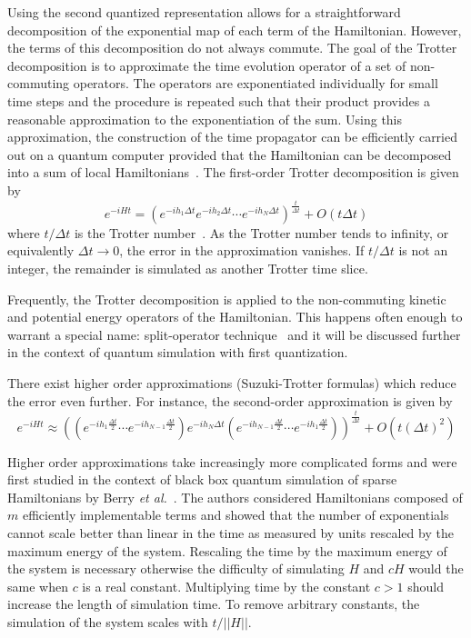 \documentclass[11pt,oneside,final]{huthesis}%
\begin{document}
Using the second quantized representation allows for a straightforward decomposition of the exponential map of each term of the Hamiltonian.  
However, the terms of this decomposition do not always commute.  The goal of the Trotter decomposition is to approximate the time evolution 
operator of a set of non-commuting operators.  The operators are exponentiated 
individually for small time steps and the procedure is repeated such that their product provides a reasonable approximation to the exponentiation of the sum.
Using this approximation, the construction of the time propagator can be efficiently carried out on a quantum
computer provided that the Hamiltonian can be decomposed into a sum of local Hamiltonians~\cite{Lloyd96}.
The first-order Trotter decomposition is given by
\begin{equation}
e^{-iHt}= \left(e^{-ih_1\Delta t}e^{-ih_2 \Delta t}\cdots e^{-ih_N\Delta t}\right)^{\frac{t}{\Delta t}}+O(t\Delta t)
    \label{eq:Trotter1stOrder}
\end{equation}
where $t/\Delta t$ is the Trotter number~\cite{Hatano05}.  As the Trotter number tends to infinity,
or equivalently $\Delta t\rightarrow 0$, the error in the approximation vanishes.
If $t/\Delta t$ is not an integer, the remainder is simulated as another Trotter time slice.

Frequently, the Trotter decomposition is applied to the non-commuting kinetic and potential energy operators of the Hamiltonian.  This happens often enough to warrant a special name: split-operator technique~\cite{Feit82,Kosloff83} and it will be discussed further in the context of quantum simulation with first quantization.

There exist higher order approximations (Suzuki-Trotter formulas) which reduce the error even further. 
For instance, the second-order approximation is given by
\begin{equation}
    e^{-iHt}\approx \left(\left(e^{-ih_1\frac{\Delta t}{2}}\cdots e^{-ih_{N-1}\frac{\Delta t}{2}}\right)e^{-ih_N\Delta t}\left(e^{-ih_{N-1}\frac{\Delta t}{2}}\cdots e^{-ih_1\frac{\Delta t}{2}}\right)\right)^\frac{t}{\Delta t}+O(t(\Delta t)^2)
    \label{eq:Trotter2ndOrder}
\end{equation}

Higher order approximations take increasingly more complicated forms \cite{Hatano05} and were first studied in the context of black box quantum simulation of sparse Hamiltonians by Berry \emph{et al.}~\cite{Berry07}.  The authors considered Hamiltonians composed of $m$ efficiently implementable terms and showed that the number of exponentials cannot scale better than linear in the time as measured by units rescaled by the maximum energy of the system.  Rescaling the time by the maximum energy of the system is necessary otherwise the difficulty of simulating $H$ and $cH$ would the same when $c$ is a real constant.  Multiplying time by the constant $c>1$ should increase the length of simulation time.  To remove arbitrary constants, the simulation of the system scales with $t/||H||$.
\end{document}
